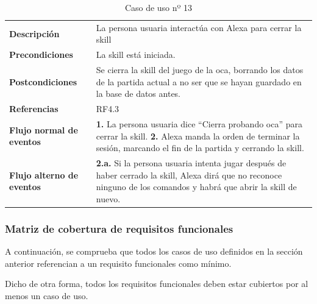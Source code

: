\begin{table}[H]
	\centering
	\begin{tabular}{|p{3cm}|p{12cm}|}
		\hline
		\rowcolor{lightgray}
		\multicolumn{2}{|c|}{\textbf{CU13}: Cerrar la skill} \\
		\hline
		\textbf{Descripción} & La persona usuaria interactúa con Alexa para cerrar la skill \vspace{0.2cm} \\
		\hline
		\textbf{Precondiciones} & La skill está iniciada. \vspace{0.2cm} \\
		\hline
		\textbf{Postcondiciones} & Se cierra la skill del juego de la oca, borrando los datos de la partida actual a no ser que se hayan guardado en la base de datos antes. \vspace{0.2cm} \\
		\hline
		\textbf{Referencias} & RF4.3 \vspace{0.2cm} \\
		\hline
		\textbf{Flujo normal de eventos} &
		\textbf{1.} La persona usuaria dice \enquote{Cierra probando oca} para cerrar la skill. \newline
		\vspace{0.2cm}
		\textbf{2.} Alexa manda la orden de terminar la sesión, marcando el fin de la partida y cerrando la skill.
		\vspace{0.2cm} \\
		\hline
		\textbf{Flujo alterno de eventos} &
		\textbf{2.a.} Si la persona usuaria intenta jugar después de haber cerrado la skill, Alexa dirá que no reconoce ninguno de los comandos y habrá que abrir la skill de nuevo. \vspace{0.2cm} \\
		\hline
	\end{tabular}
	\caption{Caso de uso nº 13}
	\label{tab:CU13}
\end{table}

\newpage
\subsubsection{Matriz de cobertura de requisitos funcionales}

A continuación, se comprueba que todos los casos de uso definidos en la sección anterior referencian a un requisito funcionales como mínimo. 

Dicho de otra forma, todos los requisitos funcionales deben estar cubiertos por al menos un caso de uso.

